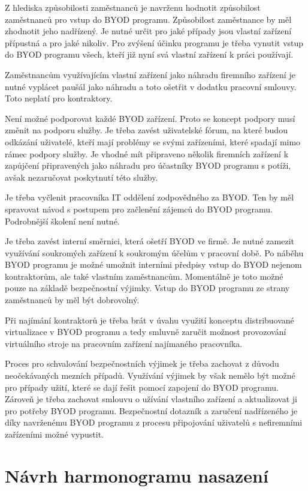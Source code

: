 Z hlediska způsobilosti zaměstnanců je navrženu hodnotit způsobilost zaměstnanců pro vstup do BYOD programu. Způsobilost zaměstnance by měl zhodnotit jeho nadřízený. Je nutné určit pro jaké případy jsou vlastní zařízení přípustná a pro jaké nikoliv. Pro zvýšení účinku programu je třeba vynutit vstup do BYOD programu všech, kteří již nyní svá vlastní zařízení k práci používají.

Zaměstnancům využívajícím vlastní zařízení jako náhradu firemního zařízení je nutné vyplácet paušál jako náhradu a toto ošetřit v dodatku pracovní smlouvy. Toto neplatí pro kontraktory.


Není možné podporovat každé BYOD zařízení. Proto se koncept podpory musí změnit na podporu služby. Je třeba zavést uživatelské fórum, na které budou odkázání uživatelé, kteří mají problémy se svými zařízeními, které spadají mimo rámec podpory služby. Je vhodné mít připraveno několik firemních zařízení k zapůjčení připravených jako náhradu pro účastníky BYOD programu s potíži, avšak nezaručovat poskytnutí této služby.

Je třeba vyčlenit pracovníka IT oddělení zodpovědného za BYOD. Ten by měl spravovat návod s postupem pro začlenění zájemců do BYOD programu. Podrobnější školení není nutné.


Je třeba zavést interní směrnici, která ošetří BYOD ve firmě. Je nutné zamezit využívání soukromých zařízení k soukromým účelům v pracovní době. Po náběhu BYOD programu je možné umožnit interními předpisy vstup do BYOD nejenom kontraktorům, ale také vlastním zaměstnancům. Momentálně je toto možné pouze na základě bezpečnostní výjimky. Vstup do BYOD programu ze strany zaměstnanců by měl být dobrovolný. 

Při najímání kontraktorů je třeba brát v úvahu využití konceptu distribuované virtualizace v BYOD programu a tedy smluvně zaručit možnost provozování virtuálního stroje na pracovním zařízení najímaného pracovníka.

Proces pro schvalování bezpečnostních výjimek je třeba zachovat z důvodu neočekávaných mezních případů. Využívání výjimek by však nemělo být možné pro případy užití, které se dají řešit pomocí zapojení do BYOD programu. Zároveň je třeba zachovat smlouvu o užívání vlastního zařízení a aktualizovat ji pro potřeby BYOD programu. Bezpečnostní dotazník a zaručení nadřízeného je díky navrženému BYOD programu z procesu připojování uživatelů s nefiremními zařízeními možné vypustit.

\section{Návrh harmonogramu nasazení}
